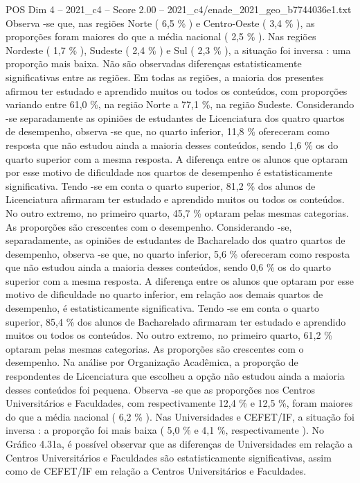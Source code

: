 \begin{textsample}{POS Dim 4 – 2021\_c4 – Score 2.00 – 2021\_c4/enade\_2021\_geo\_b7744036e1.txt}
Observa -se que, nas regiões Norte ( 6,5 \% ) e Centro-Oeste ( 3,4 \% ), as proporções foram maiores do que a média nacional ( 2,5 \% ).
Nas regiões Nordeste ( 1,7 \% ), Sudeste ( 2,4 \% ) e Sul ( 2,3 \% ), a situação foi inversa : uma proporção mais baixa.
Não são observadas diferenças estatisticamente significativas entre as regiões.
Em todas as regiões, a maioria dos presentes afirmou ter estudado e aprendido muitos ou todos os conteúdos, com proporções variando entre 61,0 \%, na região Norte a 77,1 \%, na região Sudeste.
Considerando -se separadamente as opiniões de estudantes de Licenciatura dos quatro quartos de desempenho, observa -se que, no quarto inferior, 11,8 \% ofereceram como resposta que não estudou ainda a maioria desses conteúdos, sendo 1,6 \% os do quarto superior com a mesma resposta.
A diferença entre os alunos que optaram por esse motivo de dificuldade nos quartos de desempenho é estatisticamente significativa.
Tendo -se em conta o quarto superior, 81,2 \% dos alunos de Licenciatura afirmaram ter estudado e aprendido muitos ou todos os conteúdos.
No outro extremo, no primeiro quarto, 45,7 \% optaram pelas mesmas categorias.
As proporções são crescentes com o desempenho.
Considerando -se, separadamente, as opiniões de estudantes de Bacharelado dos quatro quartos de desempenho, observa -se que, no quarto inferior, 5,6 \% ofereceram como resposta que não estudou ainda a maioria desses conteúdos, sendo 0,6 \% os do quarto superior com a mesma resposta.
A diferença entre os alunos que optaram por esse motivo de dificuldade no quarto inferior, em relação aos demais quartos de desempenho, é estatisticamente significativa.
Tendo -se em conta o quarto superior, 85,4 \% dos alunos de Bacharelado afirmaram ter estudado e aprendido muitos ou todos os conteúdos.
No outro extremo, no primeiro quarto, 61,2 \% optaram pelas mesmas categorias.
As proporções são crescentes com o desempenho.
Na análise por Organização Acadêmica, a proporção de respondentes de Licenciatura que escolheu a opção não estudou ainda a maioria desses conteúdos foi pequena.
Observa -se que as proporções nos Centros Universitários e Faculdades, com respectivamente 12,4 \% e 12,5 \%, foram maiores do que a média nacional ( 6,2 \% ).
Nas Universidades e CEFET/IF, a situação foi inversa : a proporção foi mais baixa ( 5,0 \% e 4,1 \%, respectivamente ).
No Gráfico 4.31a, é possível observar que as diferenças de Universidades em relação a Centros Universitários e Faculdades são estatisticamente significativas, assim como de CEFET/IF em relação a Centros Universitários e Faculdades.

\end{textsample}
